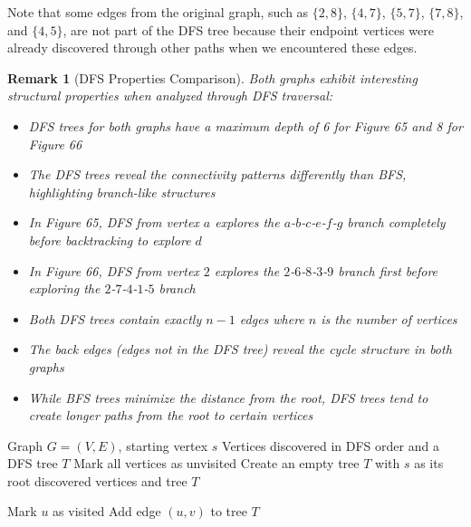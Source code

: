 \documentclass{article}
\newtheorem{remark}{Remark}
\theoremstyle{definition}
\begin{document}
Note that some edges from the original graph, such as $\{2, 8\}$, $\{4, 7\}$, $\{5, 7\}$, 
$\{7, 8\}$, and $\{4, 5\}$, are not part of the DFS tree because their endpoint vertices 
were already discovered through other paths when we encountered these edges.

\begin{remark}[DFS Properties Comparison]
Both graphs exhibit interesting structural properties when analyzed through DFS traversal:
\begin{itemize}
\item DFS trees for both graphs have a maximum depth of 6 for Figure 65 and 8 for Figure 66
\item The DFS trees reveal the connectivity patterns differently than BFS, highlighting branch-like structures
\item In Figure 65, DFS from vertex $a$ explores the $a$-$b$-$c$-$e$-$f$-$g$ branch completely before backtracking to explore $d$
\item In Figure 66, DFS from vertex $2$ explores the $2$-$6$-$8$-$3$-$9$ branch first before exploring the $2$-$7$-$4$-$1$-$5$ branch
\item Both DFS trees contain exactly $n-1$ edges where $n$ is the number of vertices
\item The back edges (edges not in the DFS tree) reveal the cycle structure in both graphs
\item While BFS trees minimize the distance from the root, DFS trees tend to create longer paths from the root to certain vertices
\end{itemize}
\end{remark}

\begin{algorithm}
\caption{Depth-First Search (DFS) - Recursive}
\begin{algorithmic}[1]
\Require Graph $G = (V, E)$, starting vertex $s$
\Ensure Vertices discovered in DFS order and a DFS tree $T$
    \State Mark all vertices as unvisited
    \State Create an empty tree $T$ with $s$ as its root
    \State {}
    \State \Return discovered vertices and tree $T$
\EndProcedure

    \State Mark $u$ as visited
            \State Add edge $(u,v)$ to tree $T$
            \State {}
        \EndIf
    \EndFor
\EndProcedure
\end{algorithmic}
\end{algorithm}
\end{document}

